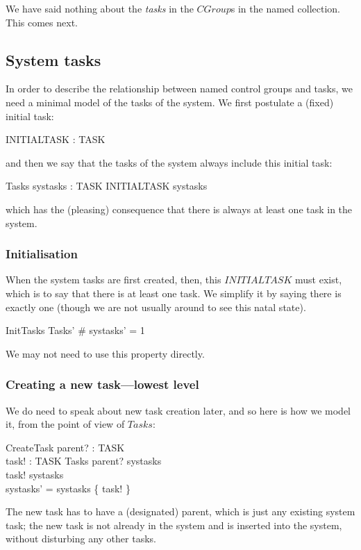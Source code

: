 \documentclass[a4paper,twoside,12pt]{article}
\begin{document}
We have said nothing about the \emph{tasks} in the $CGroup$s in the named collection.
This comes next.

\subsection{System tasks}
In order to describe the relationship between named control groups and tasks, we need a minimal model of the tasks of the system. We first postulate a (fixed) initial task:

\begin{axdef}{}
INITIALTASK : TASK
\end{axdef}
and then we say that the tasks of the system always include this initial task:

\begin{schema}{Tasks}
systasks : \finset TASK
\where
INITIALTASK \in systasks
\end{schema}
which has the (pleasing) consequence that there is always at least one task in the system.

\subsubsection{Initialisation}

When the system tasks are first created, then, this $INITIALTASK$ must exist, which is to say that there is at least one task. 
We simplify it by saying there is exactly one (though we are not usually around to see this natal state).

\begin{schema}{InitTasks}
Tasks'
\where
\# systasks' = 1
\end{schema}
We may not need to use this property directly.

\subsubsection{Creating a new task---lowest level}

We do need to speak about new task creation later, and so here is how we model it, from the point of view of $Tasks$:

\begin{schema}{CreateTask}
parent? : TASK \\
task! : TASK
\also
\Delta Tasks
\where
parent? \in systasks \\
task! \notin systasks \\
systasks' = systasks \cup \{ task! \}
\end{schema}
The new task has to have a (designated) parent, which is just any existing system task; the new task is not already
in the system and is inserted into the system, without disturbing any other tasks.
\end{document}
